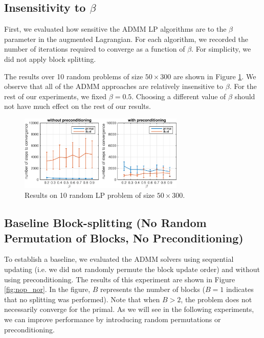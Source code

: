 \documentclass{article}
\begin{document}
\subsection*{Insensitivity to $\beta$}

First, we evaluated how sensitive the ADMM LP algorithms are to the $\beta$ parameter in the augmented Lagrangian. For each algorithm, we recorded the number of iterations required to converge as a function of $\beta$. For simplicity, we did not apply block splitting.

The results over 10 random problems of size $50 \times 300$ are shown in Figure \ref{fig:base_p_d}. We observe that all of the ADMM approaches are relatively insensitive to $\beta$. For the rest of our experiments, we fixed $\beta=0.5$. Choosing a different value of $\beta$ should not have much effect on the rest of our results. 

\begin{figure}[ht!]
	\centering
	\includegraphics[width=0.7\textwidth]{../figures/primal_dual_preconditioning.png}
	\caption{Results on 10 random LP problem of size $50 \times 300$. }
	\label{fig:base_p_d}
\end{figure}

\subsection*{Baseline Block-splitting (No Random Permutation of Blocks, No Preconditioning)}
To establish a baseline, we evaluated the ADMM solvers using sequential updating (i.e. we did not randomly permute the block update order) and without using preconditioning. The results of this experiment are shown in Figure \ref{fig:nop_nor}. In the figure, $B$ represents the number of blocks ($B=1$ indicates that no splitting was performed). Note that when $B>2$, the problem does not necessarily converge for the primal. As we will see in the following experiments, we can improve performance by introducing random permutations or preconditioning. 
\end{document}
